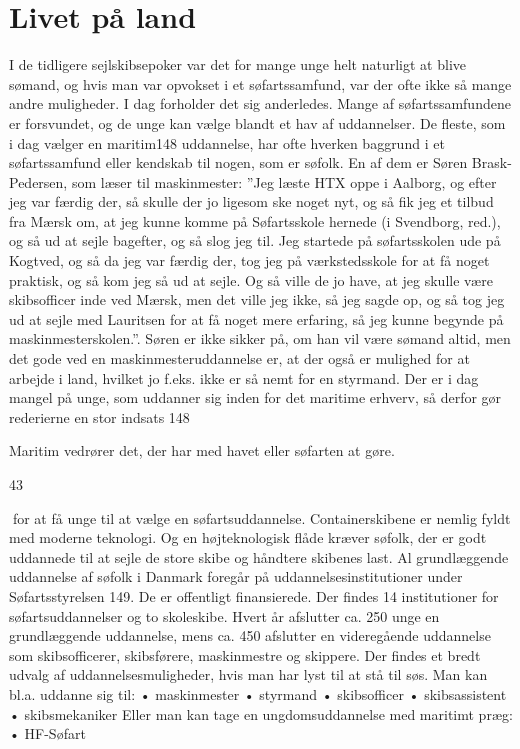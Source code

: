 \chapter{Livet på land}\label{livet-puxe5-land}

I de tidligere sejlskibsepoker var det for mange unge helt naturligt at
blive sømand, og hvis man var opvokset i et søfartssamfund, var der ofte
ikke så mange andre muligheder. I dag forholder det sig anderledes.
Mange af søfartssamfundene er forsvundet, og de unge kan vælge blandt et
hav af uddannelser. De fleste, som i dag vælger en maritim148
uddannelse, har ofte hverken baggrund i et søfartssamfund eller kendskab
til nogen, som er søfolk. En af dem er Søren Brask-Pedersen, som læser
til maskinmester: ''Jeg læste HTX oppe i Aalborg, og efter jeg var
færdig der, så skulle der jo ligesom ske noget nyt, og så fik jeg et
tilbud fra Mærsk om, at jeg kunne komme på Søfartsskole hernede (i
Svendborg, red.), og så ud at sejle bagefter, og så slog jeg til. Jeg
startede på søfartsskolen ude på Kogtved, og så da jeg var færdig der,
tog jeg på værkstedsskole for at få noget praktisk, og så kom jeg så ud
at sejle. Og så ville de jo have, at jeg skulle være skibsofficer inde
ved Mærsk, men det ville jeg ikke, så jeg sagde op, og så tog jeg ud at
sejle med Lauritsen for at få noget mere erfaring, så jeg kunne begynde
på maskinmesterskolen.''. Søren er ikke sikker på, om han vil være
sømand altid, men det gode ved en maskinmesteruddannelse er, at der også
er mulighed for at arbejde i land, hvilket jo f.eks. ikke er så nemt for
en styrmand. Der er i dag mangel på unge, som uddanner sig inden for det
maritime erhverv, så derfor gør rederierne en stor indsats 148

Maritim vedrører det, der har med havet eller søfarten at gøre.

43

for at få unge til at vælge en søfartsuddannelse. Containerskibene er
nemlig fyldt med moderne teknologi. Og en højteknologisk flåde kræver
søfolk, der er godt uddannede til at sejle de store skibe og håndtere
skibenes last. Al grundlæggende uddannelse af søfolk i Danmark foregår
på uddannelsesinstitutioner under Søfartsstyrelsen 149. De er offentligt
finansierede. Der findes 14 institutioner for søfartsuddannelser og to
skoleskibe. Hvert år afslutter ca. 250 unge en grundlæggende uddannelse,
mens ca. 450 afslutter en videregående uddannelse som skibsofficerer,
skibsførere, maskinmestre og skippere. Der findes et bredt udvalg af
uddannelsesmuligheder, hvis man har lyst til at stå til søs. Man kan
bl.a. uddanne sig til: • maskinmester • styrmand • skibsofficer •
skibsassistent • skibsmekaniker Eller man kan tage en ungdomsuddannelse
med maritimt præg: • HF-Søfart
